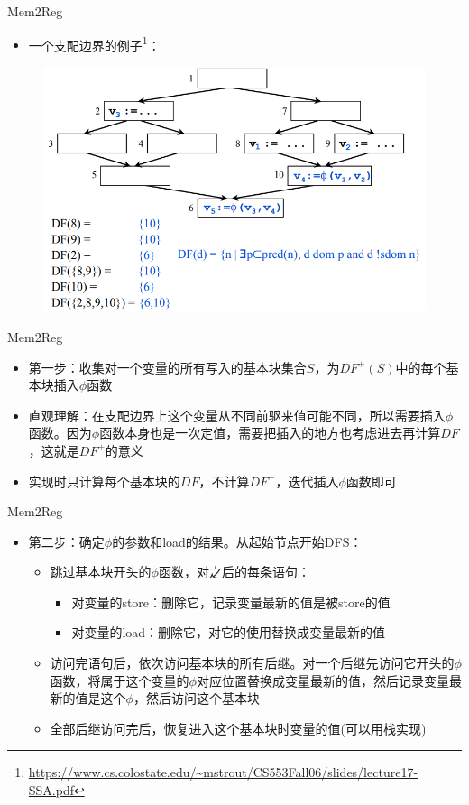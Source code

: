 \documentclass{beamer}
\begin{document}
\begin{frame}{Mem2Reg}
\begin{itemize}
  \item 一个支配边界的例子\footnote[1]{\href{https://www.cs.colostate.edu/~mstrout/CS553Fall06/slides/lecture17-SSA.pdf}{https://www.cs.colostate.edu/\textasciitilde mstrout/CS553Fall06/slides/lecture17-SSA.pdf}}：
\end{itemize}
\begin{figure}[htpb]
  \centering
  \includegraphics[width=0.8\linewidth]{pic/df.png}
\end{figure}
\end{frame}

\begin{frame}{Mem2Reg}
\begin{itemize}
  \item 第一步：收集对一个变量的所有写入的基本块集合$S$，为$DF^+(S)$中的每个基本块插入$\phi$函数
  \item 直观理解：在支配边界上这个变量从不同前驱来值可能不同，所以需要插入$\phi$函数。因为$\phi$函数本身也是一次定值，需要把插入的地方也考虑进去再计算$DF$，这就是$DF^+$的意义
  \item 实现时只计算每个基本块的$DF$，不计算$DF^+$，迭代插入$\phi$函数即可
\end{itemize}
\end{frame}

\begin{frame}{Mem2Reg}
\begin{itemize}
  \item 第二步：确定$\phi$的参数和load的结果。从起始节点开始DFS：
  \begin{itemize}
    \item 跳过基本块开头的$\phi$函数，对之后的每条语句：
    \begin{itemize}
      \item 对变量的store：删除它，记录变量最新的值是被store的值
      \item 对变量的load：删除它，对它的使用替换成变量最新的值
    \end{itemize}
    \item 访问完语句后，依次访问基本块的所有后继。对一个后继先访问它开头的$\phi$函数，将属于这个变量的$\phi$对应位置替换成变量最新的值，然后记录变量最新的值是这个$\phi$，然后访问这个基本块
    \item 全部后继访问完后，恢复进入这个基本块时变量的值(可以用栈实现)
  \end{itemize}
\end{itemize}
\end{frame}
\end{document}

